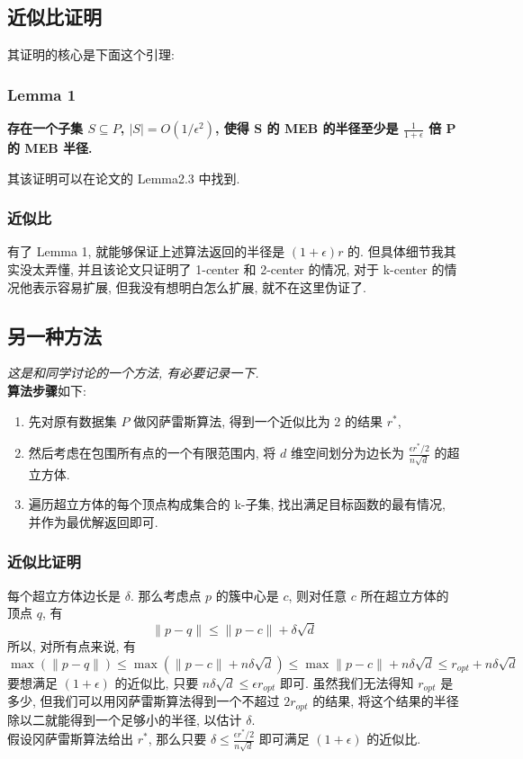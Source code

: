 \documentclass[UTF8]{article}
\newcommand{\jumpLine} {\hspace*{\fill} \par}
\begin{document}
\subsection*{近似比证明}
\noindent 其证明的核心是下面这个引理:
\subsubsection*{Lemma 1}
\noindent \textbf{存在一个子集 $S \subseteq P$, $|S|=O(1/\epsilon^2)$, 使得 S 的 MEB 的半径至少是 $\frac{1}{1+\epsilon}$ 倍 P 的 MEB 半径.} \\\jumpLine
\noindent
其该证明可以在论文的 Lemma2.3 中找到.
\subsubsection*{近似比}
\noindent 有了 Lemma 1, 就能够保证上述算法返回的半径是 $(1+\epsilon)r$ 的. 但具体细节我其实没太弄懂, 并且该论文只证明了 1-center 和 2-center 的情况, 对于 k-center 的情况他表示容易扩展, 但我没有想明白怎么扩展, 就不在这里伪证了.

\subsection*{另一种方法}
\noindent \textit{这是和同学讨论的一个方法, 有必要记录一下.} \\
\noindent \textbf{算法步骤}如下:
\begin{enumerate}
	\item 先对原有数据集 $P$ 做冈萨雷斯算法, 得到一个近似比为 2 的结果 $r^*$, 
	\item 然后考虑在包围所有点的一个有限范围内, 将 $d$ 维空间划分为边长为 $\frac{\epsilon r^*/2}{n\sqrt{d}}$ 的超立方体. 
	\item 遍历超立方体的每个顶点构成集合的 k-子集, 找出满足目标函数的最有情况, 并作为最优解返回即可.
\end{enumerate}


\subsubsection*{近似比证明}
\noindent 每个超立方体边长是 $\delta$.
那么考虑点 $p$ 的簇中心是 $c$, 则对任意 $c$ 所在超立方体的顶点 $q$, 有
$$\|p-q\| \le \|p-c\| + \delta\sqrt{d}$$
所以, 对所有点来说, 有
$$\max(\|p-q\|) \le \max(\|p-c\| + n\delta\sqrt{d}) \le \max\|p-c\| + n\delta\sqrt{d} \le r_{opt} + n\delta\sqrt{d}$$
要想满足 $(1+\epsilon)$ 的近似比, 只要 $n\delta\sqrt{d}\le \epsilon r_{opt}$ 即可.
虽然我们无法得知 $r_{opt}$ 是多少, 但我们可以用冈萨雷斯算法得到一个不超过 $2r_{opt}$ 的结果, 将这个结果的半径除以二就能得到一个足够小的半径, 以估计 $\delta$.\\
假设冈萨雷斯算法给出 $r^*$, 那么只要 $\delta \le \frac{\epsilon r^*/2}{n\sqrt{d}}$ 即可满足 $(1+\epsilon)$ 的近似比.
\end{document}
